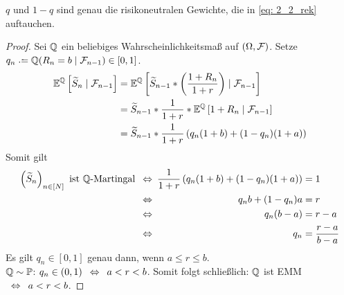 \begin{*bemerkung}
	$q$ und $1-q$ sind genau die risikoneutralen Gewichte, die in \eqref{eq: 2_2_rek} auftauchen.
\end{*bemerkung}

\begin{proof}
	Sei $\mathbb{Q}$ ein beliebiges Wahrscheinlichkeitsmaß auf $(\Omega, \mathcal{F})$. Setze $q_n \defeq \Q(R_n = b \mid \F_{n-1}) \in [0,1]$.
	\begin{equation*}
		\begin{aligned}
			\mathbb{E}^{\mathbb{Q}}\left[ \widetilde{S}_n \mid \mathcal{F}_{n-1} \right] &= \mathbb{E}^{\mathbb{Q}}\left[ \widetilde{S}_{n-1} * \left( \frac{1+R_n}{1+r} \right)  \mid \mathcal{F}_{n-1} \right] \\
			&= \widetilde{S}_{n-1} * \frac{1}{1+r} * \mathbb{E}^{\mathbb{Q}}\left[ 1+R_n \mid \mathcal{F}_{n-1} \right] \\
			&= \widetilde{S}_{n-1} * \frac{1}{1+r} \left( q_n (1+b) + (1-q_n)(1+a) \right)
		\end{aligned}
	\end{equation*}
	Somit gilt 
	\begin{equation*}
		\begin{alignedat}{2}
			\left( \widetilde{S}_n \right)_{n \in [N]} \text{ ist } \mathbb{Q} \text{-Martingal} &\enskip \Leftrightarrow \enskip &\frac{1}{1+r} \left( q_n (1+b) + (1-q_n)(1+a) \right) &= 1 \\
			&\enskip \Leftrightarrow \enskip &q_n b + (1-q_n) a &= r \\
			&\enskip \Leftrightarrow \enskip &q_n (b-a) &= r-a \\
			&\enskip \Leftrightarrow \enskip &q_n &= \frac{r-a}{b-a}
		\end{alignedat}
	\end{equation*}
	Es gilt $q_n \in [0,1]$ genau dann, wenn $a \le r \le b$. \\ 
	$\mathbb{Q} \sim \mathbb{P}$: $q_n \in (0,1) \enskip \Leftrightarrow \enskip a < r < b$.
	Somit folgt schließlich: $\mathbb{Q}$ ist EMM $\enskip \Leftrightarrow \enskip a < r < b$.
\end{proof}

